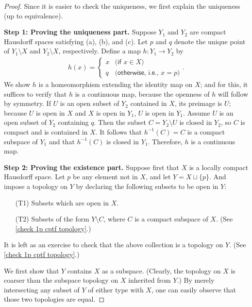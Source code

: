 \begin{proof}
    Since it is easier to check the uniqueness, we first explain the uniqueness (up to equivalence).

    \textbf{Step 1: Proving the uniqueness part.}\newline\noindent
    Suppose $Y_1$ and $Y_2$ are compact Hausdorff spaces satisfying (a), (b), and (c).
    Let $p$ and $q$ denote the unique point of $Y_1\setminus X$ and $Y_2\setminus X$, respectively.
    Define a map $h: Y_1\rightarrow Y_2$ by
    \begin{align*}
        h(x)=\left\{
        \begin{array}{cc}
            x   &   \textsf{(if $x\in X$)}\\
            q   &   \textsf{(otherwise, i.e., $x=p$)}
        \end{array}
        \right..
    \end{align*}
    We show $h$ is a homeomorphism extending the identity map on $X$; and for this, it suffices to verify that $h$ is a continuous map, because the openness of $h$ will follow by symmetry.
    If $U$ is an open subset of $Y_2$ contained in $X$, its preimage is $U$; because $U$ is open in $X$ and $X$ is open in $Y_1$, $U$ is open in $Y_1$.
    Assume $U$ is an open subset of $Y_2$ containing $q$.
    Then the subset $C=Y_2\setminus U$ is closed in $Y_2$, so $C$ is compact and is contained in $X$.
    It follows that $h^{-1}(C)=C$ is a compact subspace of $Y_1$ and that $h^{-1}(C)$ is closed in $Y_1$.
    Therefore, $h$ is a continuous map.

    \textbf{Step 2: Proving the existence part.}\newline\noindent
    Suppose first that $X$ is a locally compact Hausdorff space.
    Let $p$ be any element not in $X$, and let $Y=X\sqcup\{p\}$.
    And impose a topology on $Y$ by declaring the following subsets to be open in $Y$:
    \begin{enumerate}
        \item[(T1)]
        {
            Subsets which are open in $X$.
        }
        \item[(T2)]
        {
            Subsets of the form $Y\setminus C$, where $C$ is a compact subspace of $X$. (See \cref{check 1p cptf topology}.)
        }
    \end{enumerate}
    It is left as an exercise to check that the above collection is a topology on $Y$. (See \cref{check 1p cptf topology}.)

    We first show that $Y$ contains $X$ as a subspace.
    (Clearly, the topology on $X$ is coarser than the subspace topology on $X$ inherited from $Y$.)
    By merely intersecting any subset of $Y$ of either type with $X$, one can easily observe that those two topologies are equal.


\end{proof}
